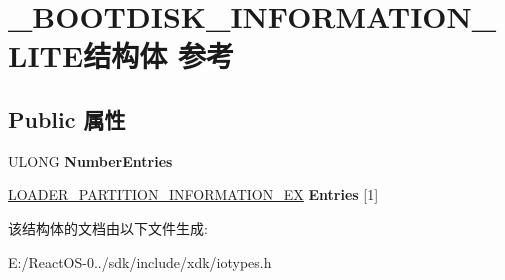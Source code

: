 \hypertarget{struct___b_o_o_t_d_i_s_k___i_n_f_o_r_m_a_t_i_o_n___l_i_t_e}{}\section{\+\_\+\+B\+O\+O\+T\+D\+I\+S\+K\+\_\+\+I\+N\+F\+O\+R\+M\+A\+T\+I\+O\+N\+\_\+\+L\+I\+T\+E结构体 参考}
\label{struct___b_o_o_t_d_i_s_k___i_n_f_o_r_m_a_t_i_o_n___l_i_t_e}
\subsection*{Public 属性}
\begin{DoxyCompactItemize}
\item 
\mbox{\label{struct___b_o_o_t_d_i_s_k___i_n_f_o_r_m_a_t_i_o_n___l_i_t_e_af120a062862a4dc223dc8220c34bbdd9}} 
U\+L\+O\+NG {\bfseries Number\+Entries}
\item 
\mbox{\label{struct___b_o_o_t_d_i_s_k___i_n_f_o_r_m_a_t_i_o_n___l_i_t_e_a2f0129cf8fc47399e956b6aa217b8a22}} 
\hyperlink{struct___l_o_a_d_e_r___p_a_r_t_i_t_i_o_n___i_n_f_o_r_m_a_t_i_o_n___e_x}{L\+O\+A\+D\+E\+R\+\_\+\+P\+A\+R\+T\+I\+T\+I\+O\+N\+\_\+\+I\+N\+F\+O\+R\+M\+A\+T\+I\+O\+N\+\_\+\+EX} {\bfseries Entries} \mbox{[}1\mbox{]}
\end{DoxyCompactItemize}


该结构体的文档由以下文件生成\+:\begin{DoxyCompactItemize}
\item 
E\+:/\+React\+O\+S-\/0../sdk/include/xdk/iotypes.\+h\end{DoxyCompactItemize}
